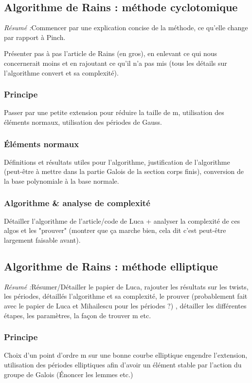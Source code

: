 \documentclass[a4paper]{article} %
\numberwithin{equation}{section}
\begin{document}
\subsection{Algorithme de Rains : méthode cyclotomique}
\textit{Résumé :}Commencer par une explication concise de la méthode, ce 
qu'elle change par rapport à Pinch.\par
Présenter pas à pas l'article de Rains (en gros), en enlevant ce qui nous 
concernerait moins et en rajoutant ce qu'il n'a pas mis (tous les détails 
sur l'algorithme convert et sa complexité).
\subsubsection{Principe}
Passer par une petite extension pour réduire la taille de m, utilisation des
éléments normaux, utilisation des périodes de Gauss.
\subsubsection{Éléments normaux}
Définitions et résultats utiles pour l'algorithme, justification de
l'algorithme (peut-être à mettre dans la partie Galois de la section corps
finis), conversion de la base polynomiale à la base normale.
\subsubsection{Algorithme \& analyse de complexité}
Détailler l'algorithme de l'article/code de Luca + analyser la complexité de ces
algos et les "prouver" (montrer que ça marche bien, cela dit c'est peut-être
largement faisable avant).

\subsection{Algorithme de Rains : méthode elliptique}
\textit{Résumé :}Résumer/Détailler le papier de Luca, rajouter les résultats sur
les twists, les périodes, détaillés l'algorithme et sa complexité, le prouver 
(probablement fait avec le papier de Luca et Mihailescu pour les périodes ?)
, détailler les différentes étapes, les paramètres, la façon de trouver m 
etc.
\subsubsection{Principe}
Choix d'un point d'ordre m sur une bonne courbe elliptique engendre 
l'extension, utilisation des périodes elliptiques afin d'avoir un élément 
stable par l'action du groupe de Galois (Énoncer les lemmes etc.)
\end{document}
